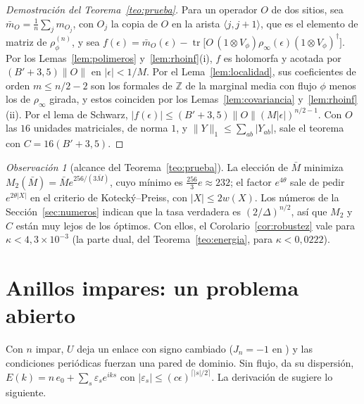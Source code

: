 \documentclass[11pt,a4paper]{article}
\theoremstyle{remark}
\newtheorem*{observacion}{Observación}
\newcommand{\tr}{\operatorname{tr}}
\begin{document}
\begin{proof}[Demostración del Teorema~\ref{teo:prueba}]
Para un operador $O$ de dos sitios, sea $\bar m_O=\frac1n\sum_jm_{O_j}$, con $O_j$ la
copia de $O$ en la arista $\langle j,j{+}1\rangle$, que es el elemento de matriz de $\rho^{(n)}_\phi$, y sea
$f(\epsilon)=\bar m_O(\epsilon)-\tr\big[O\,(1\otimes V_\phi)\rho_\infty(\epsilon)(1\otimes V_\phi)^\dagger\big]$. Por los
Lemas~\ref{lem:polimeros} y~\ref{lem:rhoinf}(i), $f$ es holomorfa y acotada por $(B'+3{,}5)\|O\|$ en
$|\epsilon|<1/M$. Por el Lema~\ref{lem:localidad}, sus coeficientes de orden $m\le n/2-2$ son los formales de $\mathbb Z$ de
la marginal media con flujo $\phi$ menos los de $\rho_\infty$ girada, y estos coinciden por los
Lemas~\ref{lem:covariancia} y~\ref{lem:rhoinf}(ii). Por el lema de Schwarz,
$|f(\epsilon)|\le(B'+3{,}5)\|O\|(M|\epsilon|)^{n/2-1}$. Con $O$ las $16$ unidades matriciales, de norma
$1$, y $\|Y\|_1\le\sum_{ab}|Y_{ab}|$, sale el teorema con $C=16(B'+3{,}5)$.
\end{proof}

\begin{observacion}[alcance del Teorema~\ref{teo:prueba}]
La elección de $\bar M$ minimiza $M_2(\bar M)=\bar Me^{256/(3\bar M)}$, cuyo mínimo es $\tfrac{256}3e\approx232$; el
factor $e^{4\theta}$ sale de pedir $e^{2\theta|X|}$ en el criterio de Kotecký--Preiss, con $|X|\le2w(X)$. Los
números de la Sección~\ref{sec:numeros} indican que la tasa verdadera es $(2/\Delta)^{n/2}$, así que
$M_2$ y $C$ están muy lejos de los óptimos. Con ellos, el Corolario~\ref{cor:robustez} vale para
$\kappa<4{,}3\times10^{-3}$ (la parte dual, del Teorema~\ref{teo:energia}, para
$\kappa<0{,}0222$).
\end{observacion}

\section{Anillos impares: un problema abierto}\label{sec:impar}

Con $n$ impar, $U$ deja un enlace con signo cambiado ($J_n=-1$ en \cite[ec.~(125)]{dk-kink}) y las
condiciones periódicas fuerzan una pared de dominio. Sin flujo, \cite[Teorema~2]{dk-kink} da su
dispersión, $E(k)=n\,e_0+\sum_s\varepsilon_se^{iks}$ con $|\varepsilon_s|\le(c\epsilon)^{\lceil|s|/2\rceil}$. La
derivación de \cite[Sec.~6, $n$ impar]{robustez} sugiere lo siguiente.
\end{document}
